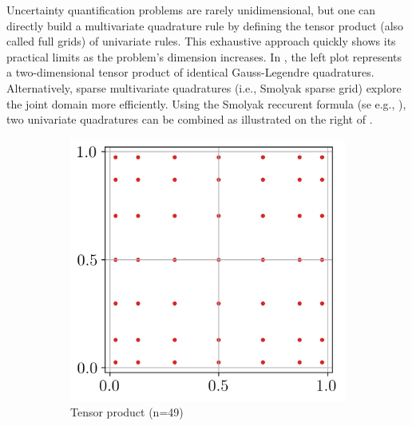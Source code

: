 Uncertainty quantification problems are rarely unidimensional, but one can directly build a multivariate quadrature rule by defining the tensor product (also called full grids) of univariate rules. 
This exhaustive approach quickly shows its practical limits as the problem's dimension increases. 
In , the left plot represents a two-dimensional tensor product of identical Gauss-Legendre quadratures. 
Alternatively, sparse multivariate quadratures (i.e., Smolyak sparse grid) explore the joint domain more efficiently. 
Using the Smolyak reccurent formula (se e.g., \citealt{sullivan_2015}), two univariate quadratures can be combined as illustrated on the right of . 

\begin{figure}[h!]
    \centering
    \begin{subfigure}[b]{0.32\textwidth}
        \centering
        \includegraphics[width=\textwidth]{../numerical_experiments/chapter1/figures/tensorized_gaussian_quadrature.png}
        \caption{Tensor product (n=49)}
    \end{subfigure}
    \quad
    \begin{subfigure}[b]{0.32\textwidth}
        \centering

\end{subfigure}
\end{figure}
